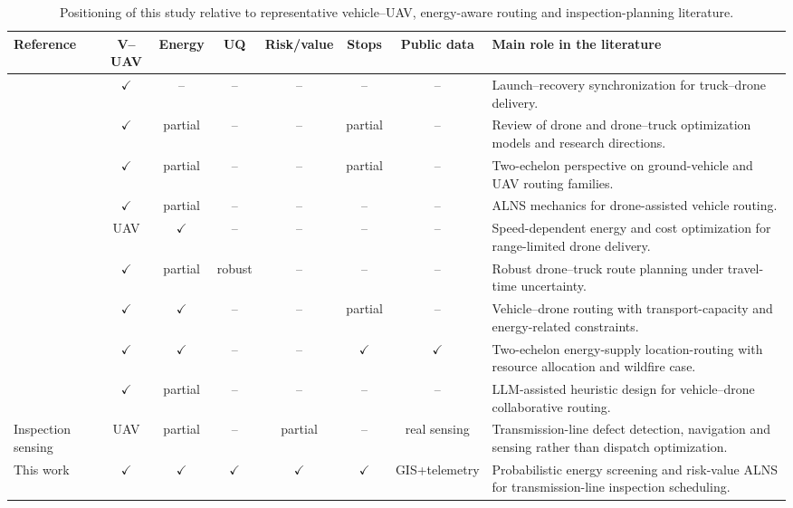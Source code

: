 \begin{table}[t]
\centering
\caption{Positioning of this study relative to representative vehicle--UAV, energy-aware routing and inspection-planning literature.}
\label{tab:literature-position}
\scriptsize
\begin{tabularx}{\textwidth}{@{}>{\raggedright\arraybackslash}p{}cccccc>{\raggedright\arraybackslash}X@{}}
\toprule
Reference & V--UAV & Energy & UQ & Risk/value & Stops & Public data & Main role in the literature \\
\midrule
\citet{murray2015flying} & \(\checkmark\) & -- & -- & -- & -- & -- & Launch--recovery synchronization for truck--drone delivery. \\
\citet{chung2020review} & \(\checkmark\) & partial & -- & -- & partial & -- & Review of drone and drone--truck optimization models and research directions. \\
\citet{li2021groundvehicle} & \(\checkmark\) & partial & -- & -- & partial & -- & Two-echelon perspective on ground-vehicle and UAV routing families. \\
\citet{sacramento2019alns} & \(\checkmark\) & partial & -- & -- & -- & -- & ALNS mechanics for drone-assisted vehicle routing. \\
\citet{dukkanci2021range} & UAV & \(\checkmark\) & -- & -- & -- & -- & Speed-dependent energy and cost optimization for range-limited drone delivery. \\
\citet{yang2023robustdrone} & \(\checkmark\) & partial & robust & -- & -- & -- & Robust drone--truck route planning under travel-time uncertainty. \\
\citet{moadab2022drone} & \(\checkmark\) & \(\checkmark\) & -- & -- & partial & -- & Vehicle--drone routing with transport-capacity and energy-related constraints. \\
\citet{kim2026bidirectional} & \(\checkmark\) & \(\checkmark\) & -- & -- & \(\checkmark\) & \(\checkmark\) & Two-echelon energy-supply location-routing with resource allocation and wildfire case. \\
\citet{shi2026llm} & \(\checkmark\) & partial & -- & -- & -- & -- & LLM-assisted heuristic design for vehicle--drone collaborative routing. \\
Inspection sensing \citep{nguyen2018visionreview,li2021uavtransmission,zhang2020visualinspection} & UAV & partial & -- & partial & -- & real sensing & Transmission-line defect detection, navigation and sensing rather than dispatch optimization. \\
This work & \(\checkmark\) & \(\checkmark\) & \(\checkmark\) & \(\checkmark\) & \(\checkmark\) & GIS+telemetry & Probabilistic energy screening and risk-value ALNS for transmission-line inspection scheduling. \\
\bottomrule
\end{tabularx}
\end{table}
